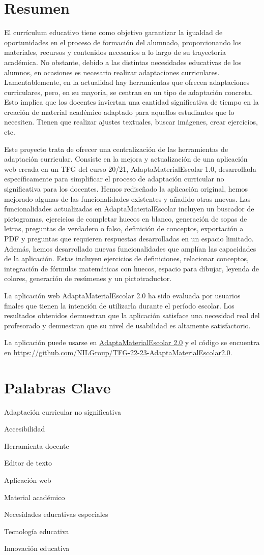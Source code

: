 \chapter{Resumen}

El currículum educativo tiene como objetivo garantizar la igualdad de oportunidades en el proceso de formación del alumnado, proporcionando los materiales, recursos y contenidos necesarios a lo largo de su trayectoria académica. No obstante, debido a las distintas necesidades educativas de los alumnos, en ocasiones es necesario realizar adaptaciones curriculares. Lamentablemente, en la actualidad hay herramientas que ofrecen adaptaciones curriculares, pero, en su mayoría, se centran en un tipo de adaptación concreta. Esto implica que los docentes inviertan una cantidad significativa de tiempo en la creación de material académico adaptado para aquellos estudiantes que lo necesiten. Tienen que realizar ajustes textuales, buscar imágenes, crear ejercicios, etc.

Este proyecto trata de ofrecer una centralización de las herramientas de adaptación curricular. Consiste en la mejora y actualización de una aplicación web creada en un TFG del curso 20/21, AdaptaMaterialEscolar 1.0, desarrollada específicamente para simplificar el proceso de adaptación curricular no significativa para los docentes. Hemos rediseñado la aplicación original, hemos mejorado algunas de las funcionalidades existentes y añadido otras nuevas. Las funcionalidades actualizadas en AdaptaMaterialEscolar incluyen un buscador de pictogramas, ejercicios de completar huecos en blanco, generación de sopas de letras, preguntas de verdadero o falso, definición de conceptos, exportación a PDF y preguntas que requieren respuestas desarrolladas en un espacio limitado. Además, hemos desarrollado nuevas funcionalidades que amplían las capacidades de la aplicación. Estas incluyen ejercicios de definiciones, relacionar conceptos, integración de fórmulas matemáticas con huecos, espacio para dibujar, leyenda de colores, generación de resúmenes y un pictotraductor.

La aplicación web AdaptaMaterialEscolar 2.0 ha sido evaluada por usuarios finales que tienen la intención de utilizarla durante el período escolar. Los resultados obtenidos demuestran que la aplicación satisface una necesidad real del profesorado y demuestran que su nivel de usabilidad es altamente satisfactorio.

La aplicación puede usarse en \href{http://143.47.43.25/}{AdaptaMaterialEscolar 2.0} y el código se encuentra en \url{https://github.com/NILGroup/TFG-22-23-AdaptaMaterialEscolar2.0}.

\chapter{Palabras Clave}

Adaptación curricular no significativa

Accesibilidad

Herramienta docente

Editor de texto

Aplicación web

Material académico

Necesidades educativas especiales

Tecnología educativa

Innovación educativa



